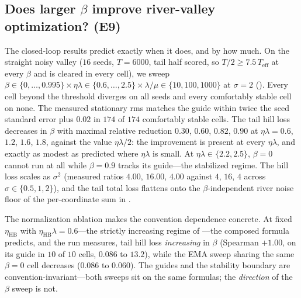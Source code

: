 \documentclass[11pt,a4paper]{article}
\theoremstyle{remark}
\newcommand{\Teff}{T_{\mathrm{eff}}}
\begin{document}
\subsection{Does larger $\beta$ improve river-valley optimization? (E9)}
\label{sec:e9}
The closed-loop results predict exactly when it does, and by how much.
On the straight noisy valley ($16$ seeds, $T=6000$, tail half scored, so $T/2\ge7.5\,\Teff$ at every $\beta$ and  is cleared in every cell), we sweep $\beta\in\{0,\dots,0.995\}\times\eta\lambda\in\{0.6,\dots,2.5\}\times\lambda/\mu\in\{10,100,1000\}$ at $\sigma=2$ ().
Every cell beyond the  threshold diverges on all seeds and every comfortably stable cell on none.
The measured stationary rms matches the  guide within twice the seed standard error plus $0.02$ in $174$ of $174$ comfortably stable cells.
The tail hill loss decreases in $\beta$ with maximal relative reduction $0.30$, $0.60$, $0.82$, $0.90$ at $\eta\lambda=0.6$, $1.2$, $1.6$, $1.8$, against the  value $\eta\lambda/2$: the improvement is present at every $\eta\lambda$, and exactly as modest as predicted where $\eta\lambda$ is small.
At $\eta\lambda\in\{2.2,2.5\}$, $\beta=0$ cannot run at all while $\beta=0.9$ tracks its guide---the stabilized regime.
The hill loss scales as $\sigma^2$ (measured ratios $4.00$, $16.00$, $4.00$ against $4$, $16$, $4$ across $\sigma\in\{0.5,1,2\}$), and the tail total loss flattens onto the $\beta$-independent river noise floor of the per-coordinate sum in .

The normalization ablation makes the convention dependence concrete.
At fixed $\eta_{\mathrm{HB}}$ with $\eta_{\mathrm{HB}}\lambda=0.6$---the strictly increasing regime of ---the composed formula predicts, and the run measures, tail hill loss \emph{increasing} in $\beta$ (Spearman $+1.00$, on its guide in $10$ of $10$ cells, $0.086$ to $13.2$), while the EMA sweep sharing the same $\beta=0$ cell decreases ($0.086$ to $0.060$).
The guides and the stability boundary are convention-invariant---both sweeps sit on the same formulas; the \emph{direction} of the $\beta$ sweep is not.
\end{document}
